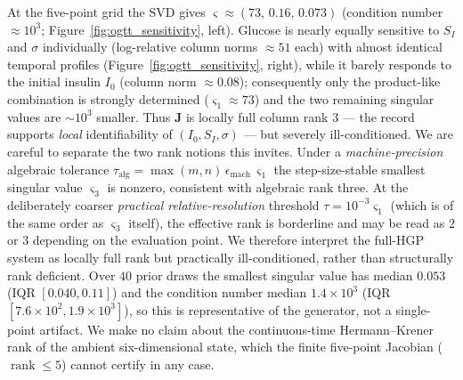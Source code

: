 At the five-point grid the SVD gives $\varsigma\approx(73,\,0.16,\,0.073)$ (condition number $\approx10^3$; Figure~\ref{fig:ogtt_sensitivity}, left). Glucose is nearly equally sensitive to $S_I$ and $\sigma$ individually (log-relative column norms $\approx51$ each) with almost identical temporal profiles (Figure~\ref{fig:ogtt_sensitivity}, right), while it barely responds to the initial insulin $I_0$ (column norm $\approx0.08$); consequently only the product-like combination is strongly determined ($\varsigma_1\approx73$) and the two remaining singular values are $\sim\!10^3$ smaller. Thus $\mathbf{J}$ is locally full column rank $3$ --- the record supports \emph{local} identifiability of $(I_0,S_I,\sigma)$ --- but severely ill-conditioned. We are careful to separate the two rank notions this invites. Under a \emph{machine-precision} algebraic tolerance $\tau_{\mathrm{alg}}=\max(m,n)\,\epsilon_{\mathrm{mach}}\,\varsigma_1$ the step-size-stable smallest singular value $\varsigma_3$ is nonzero, consistent with algebraic rank three. At the deliberately coarser \emph{practical relative-resolution} threshold $\tau=10^{-3}\varsigma_1$ (which is of the same order as $\varsigma_3$ itself), the effective rank is borderline and may be read as $2$ or $3$ depending on the evaluation point. We therefore interpret the full-HGP system as locally full rank but practically ill-conditioned, rather than structurally rank deficient. Over $40$ prior draws the smallest singular value has median $0.053$ (IQR $[0.040,0.11]$) and the condition number median $1.4\times10^3$ (IQR $[7.6\times10^2,1.9\times10^3]$), so this is representative of the generator, not a single-point artifact. We make no claim about the continuous-time Hermann--Krener rank of the ambient six-dimensional state, which the finite five-point Jacobian ($\operatorname{rank}\le5$) cannot certify in any case.

